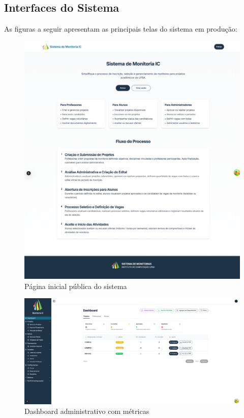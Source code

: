 \documentclass[portuguese]{sbc2025}%
\begin{document}
\subsection{Interfaces do Sistema}

As figuras a seguir apresentam as principais telas do sistema em produção:

\begin{figure}[h!]
  \centering
  \includegraphics[width=\linewidth]{images/monitoria/landing.png}
  \caption{Página inicial pública do sistema}
  \label{fig:landing}
\end{figure}

\begin{figure}[h!]
  \centering
  \includegraphics[width=\linewidth]{images/monitoria/admin-dashboard.png}
  \caption{Dashboard administrativo com métricas}
  \label{fig:dashboard}
\end{figure}
\end{document}
